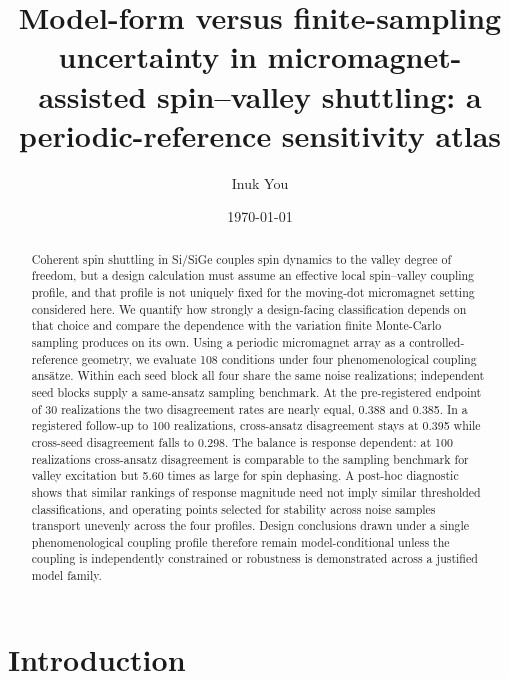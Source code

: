 \documentclass[aip,jap,reprint,superscriptaddress,longbibliography,floatfix]{revtex4-2}
\begin{document}
\title{Model-form versus finite-sampling uncertainty in
micromagnet-assisted spin--valley shuttling: a periodic-reference
sensitivity atlas}

\author{Inuk You}

\date{\today}

\begin{abstract}
Coherent spin shuttling in Si/SiGe couples spin dynamics to the valley degree of
freedom, but a design calculation must assume an effective local spin--valley
coupling profile, and that profile is not uniquely fixed for the moving-dot
micromagnet setting considered here. We quantify how strongly a design-facing
classification depends on that choice and compare the dependence with the
variation finite Monte-Carlo sampling produces on its own. Using a periodic
micromagnet array as a controlled-reference geometry, we evaluate 108
conditions under four phenomenological coupling ans\"atze. Within each seed
block all four share the same noise realizations; independent seed blocks
supply a same-ansatz sampling benchmark. At the pre-registered endpoint of 30
realizations the two disagreement rates are nearly equal, 0.388 and 0.385. In a
registered follow-up to 100 realizations, cross-ansatz disagreement stays at
0.395 while cross-seed disagreement falls to 0.298. The balance is response
dependent: at 100 realizations cross-ansatz disagreement is comparable to the
sampling benchmark for valley excitation but 5.60 times as large for spin
dephasing. A post-hoc diagnostic shows that similar rankings of response
magnitude need not imply similar thresholded classifications, and operating
points selected for stability across noise samples transport unevenly across
the four profiles. Design conclusions drawn under a single phenomenological
coupling profile therefore remain model-conditional unless the coupling is
independently constrained or robustness is demonstrated across a justified
model family.
\end{abstract}

\maketitle

\section{Introduction}
\end{document}
